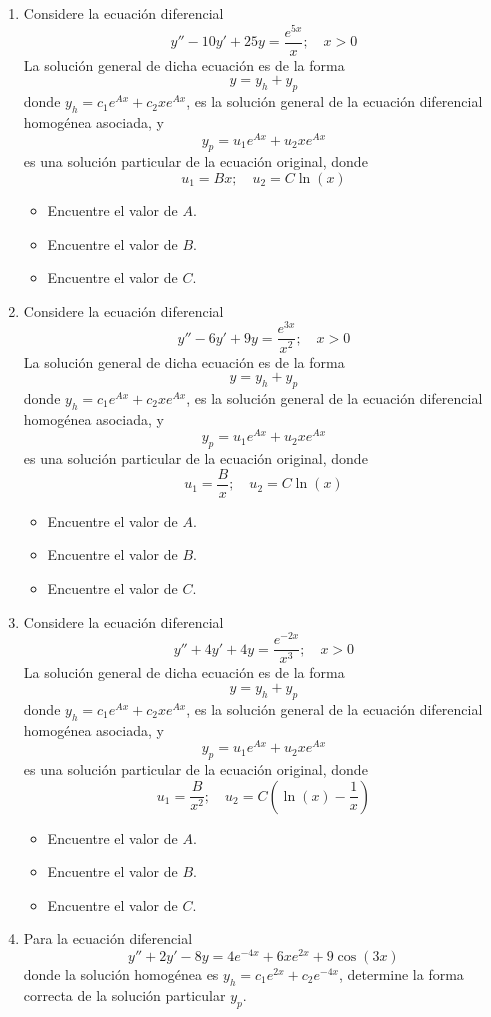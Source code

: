 \begin{enumerate}
\item Considere la ecuación diferencial
$$y'' -10y' +25y = \dfrac{e^{5x}}{x}; \quad x>0$$
La solución general de dicha ecuación es de la forma 
$$y = y_h + y_p$$
donde $y_h = c_1e^{Ax} + c_2xe^{Ax}$, es la solución general de la ecuación diferencial homogénea asociada, y 
$$y_p = u_1e^{Ax} + u_2xe^{Ax}$$
es una solución particular de la ecuación original, donde
$$u_1 = Bx; \quad u_2 = C \ln(x)$$
\begin{itemize}
    \item Encuentre el valor de $A$.
    \item Encuentre el valor de $B$.
    \item Encuentre el valor de $C$.
\end{itemize}


\item Considere la ecuación diferencial
$$y'' - 6y' + 9y = \frac{e^{3x}}{x^2}; \quad x > 0$$
La solución general de dicha ecuación es de la forma
$$y = y_h + y_p$$
donde $y_h = c_1e^{Ax} + c_2xe^{Ax}$, es la solución general de la ecuación diferencial homogénea asociada, y
$$y_p = u_1e^{Ax} + u_2xe^{Ax}$$
es una solución particular de la ecuación original, donde
$$u_1 = \frac{B}{x}; \quad u_2 = C\ln(x)$$
\begin{itemize}
    \item Encuentre el valor de $A$.
    \item Encuentre el valor de $B$.
    \item Encuentre el valor de $C$.
\end{itemize}

\item Considere la ecuación diferencial
$$y'' + 4y' + 4y = \frac{e^{-2x}}{x^3}; \quad x > 0$$
La solución general de dicha ecuación es de la forma
$$y = y_h + y_p$$
donde $y_h = c_1e^{Ax} + c_2xe^{Ax}$, es la solución general de la ecuación diferencial homogénea asociada, y
$$y_p = u_1e^{Ax} + u_2xe^{Ax}$$
es una solución particular de la ecuación original, donde
$$u_1 = \frac{B}{x^2}; \quad u_2 = C\left(\ln(x) - \frac{1}{x}\right)$$
\begin{itemize}
    \item Encuentre el valor de $A$.
    \item Encuentre el valor de $B$.
    \item Encuentre el valor de $C$.
\end{itemize}

\item Para la ecuación diferencial
$$y'' + 2y' - 8y = 4e^{-4x} + 6xe^{2x} + 9\cos(3x)$$
donde la solución homogénea es $y_h = c_1e^{2x} + c_2e^{-4x}$, determine la forma correcta de la solución particular $y_p$.


\end{enumerate}
